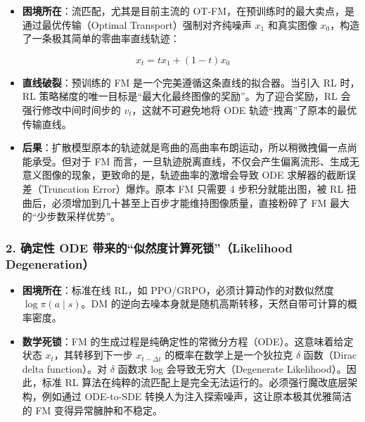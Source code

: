 \begin{itemize}
\tightlist
\item
  \textbf{困境所在}：流匹配，尤其是目前主流的 OT-FM，在预训练时的最大卖点，是通过最优传输（Optimal Transport）强制对齐纯噪声 \(x_1\) 和真实图像 \(x_0\)，构造了一条极其简单的零曲率直线轨迹：
\end{itemize}

\[
x_t=t x_1+(1-t)x_0
\]

\begin{itemize}
\tightlist
\item
  \textbf{直线破裂}：预训练的 FM 是一个完美遵循这条直线的拟合器。当引入 RL 时，RL 策略梯度的唯一目标是``最大化最终图像的奖励''。为了迎合奖励，RL 会强行修改中间时间步的 \(v_t\)，这就不可避免地将 ODE 轨迹``拽离''了原本的最优传输直线。
\item
  \textbf{后果}：扩散模型原本的轨迹就是弯曲的高曲率布朗运动，所以稍微拽偏一点尚能承受。但对于 FM 而言，一旦轨迹脱离直线，不仅会产生偏离流形、生成无意义图像的现象，更致命的是，轨迹曲率的激增会导致 ODE 求解器的截断误差（Truncation Error）爆炸。原本 FM 只需要 4 步积分就能出图，被 RL 扭曲后，必须增加到几十甚至上百步才能维持图像质量，直接粉碎了 FM 最大的``少步数采样优势''。
\end{itemize}

\hypertarget{ux786eux5b9aux6027-ode-ux5e26ux6765ux7684ux4f3cux7136ux5ea6ux8ba1ux7b97ux6b7bux9501likelihood-degeneration}{%
\subsubsection{2. 确定性 ODE 带来的``似然度计算死锁''（Likelihood Degeneration）}\label{ux786eux5b9aux6027-ode-ux5e26ux6765ux7684ux4f3cux7136ux5ea6ux8ba1ux7b97ux6b7bux9501likelihood-degeneration}}

\begin{itemize}
\tightlist
\item
  \textbf{困境所在}：标准在线 RL，如 PPO/GRPO，必须计算动作的对数似然度 \(\log\pi(a\mid s)\)。DM 的逆向去噪本身就是随机高斯转移，天然自带可计算的概率密度。
\item
  \textbf{数学死锁}：FM 的生成过程是纯确定性的常微分方程（ODE）。这意味着给定状态 \(x_t\)，其转移到下一步 \(x_{t-\Delta t}\) 的概率在数学上是一个狄拉克 \(\delta\) 函数（Dirac delta function）。对 \(\delta\) 函数求 log 会导致无穷大（Degenerate Likelihood）。因此，标准 RL 算法在纯粹的流匹配上是完全无法运行的。必须强行魔改底层架构，例如通过 ODE-to-SDE 转换人为注入探索噪声，这让原本极其优雅简洁的 FM 变得异常臃肿和不稳定。
\end{itemize}

